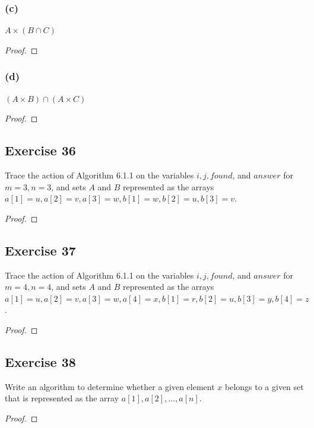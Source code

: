 \documentclass[14pt]{extarticle}
\begin{document}
\subsubsection{(c)}
$A \times (B \cap C)$

\begin{proof}

\end{proof}

\subsubsection{(d)}
$(A \times B) \cap (A \times C)$

\begin{proof}

\end{proof}

\subsection{Exercise 36}
Trace the action of Algorithm 6.1.1 on the variables $i, j, found$, and $answer$ for $m = 3, n = 3$, and sets $A$ and 
$B$ represented as the arrays \(a[1] = u, a[2] = v, a[3] = w, b[1] = w, b[2] = u, b[3] = v\).

\begin{proof}

\end{proof}

\subsection{Exercise 37}
Trace the action of Algorithm 6.1.1 on the variables $i, j, found$, and $answer$ for $m = 4, n = 4$, and sets $A$ and 
$B$ represented as the arrays \(a[1] = u, a[2] = v, a[3] = w, a[4] = x, b[1] = r, b[2] = u, b[3] = y, b[4] = z\).

\begin{proof}

\end{proof}

\subsection{Exercise 38}
Write an algorithm to determine whether a given element $x$ belongs to a given set that is represented as the array 
\(a[1], a[2], \ldots, a[n]\).

\begin{proof}

\end{proof}
\end{document}
